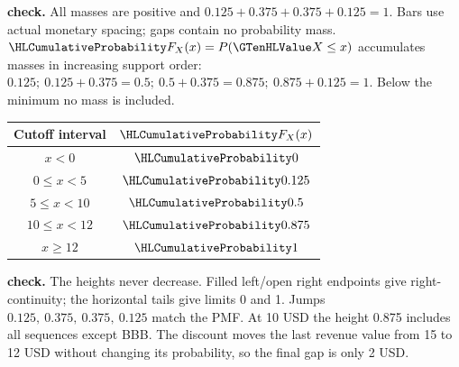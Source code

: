 \textbf{ check.} All masses are positive and $0.125+0.375+0.375+0.125=1$. Bars use actual monetary spacing; gaps contain no probability mass.
\clearpage
{}
$\cTwoCDFHL{F_X(x)}=P(\cTwoValue{X}\leq x)$ accumulates masses in increasing support order: $0.125;\ 0.125+0.375=0.5;\ 0.5+0.375=0.875;\ 0.875+0.125=1$. Below the minimum no mass is included.
\par\noindent\begin{minipage}[t]{.38\linewidth}\vspace{0pt}\centering\begin{tabular}{cc}\toprule Cutoff interval & $\cTwoCDFHL{F_X(x)}$ \\\midrule
$x<0$ & $\cTwoCDFHL{0}$ \\
$0\leq x<5$ & $\cTwoCDFHL{0.125}$ \\
$5\leq x<10$ & $\cTwoCDFHL{0.5}$ \\
$10\leq x<12$ & $\cTwoCDFHL{0.875}$ \\
$x\geq 12$ & $\cTwoCDFHL{1}$ \\
\bottomrule\end{tabular}\end{minipage}\hfill\begin{minipage}[t]{.59\linewidth}\vspace{0pt}\centering{}\end{minipage}\par
\textbf{ check.} The heights never decrease. Filled left/open right endpoints give right-continuity; the horizontal tails give limits 0 and 1. Jumps $0.125,\ 0.375,\ 0.375,\ 0.125$ match the PMF. At 10 USD the height 0.875 includes all sequences except BBB. The discount moves the last revenue value from 15 to 12 USD without changing its probability, so the final gap is only 2 USD.
\clearpage

